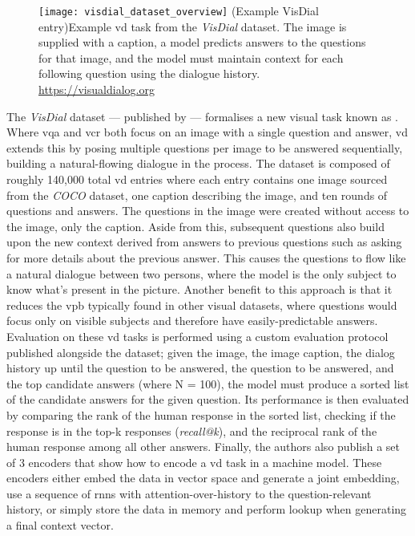 \begin{figure}[htbp]
    \centering
    \texttt{[image: visdial\_dataset\_overview]}
    \captionsource(Example VisDial entry){Example \gls{vd} task from the \textit{VisDial} dataset. The image is supplied with a caption, a model predicts answers to the questions for that image, and the model must maintain context for each following question using the dialogue history. \label{fig:visdial_question_answer}}{\url{https://visualdialog.org}}
\end{figure}

The \textit{VisDial} dataset --- published by \citeauthor{das_visual_2019} \cite{das_visual_2019} --- formalises a new visual task known as .
Where \gls{vqa} and \gls{vcr} both focus on an image with a single question and answer, \gls{vd} extends this by posing multiple questions per image to be answered sequentially, building a natural-flowing dialogue in the process.
The dataset is composed of roughly 140,000 total \gls{vd} entries where each entry contains one image sourced from the \textit{COCO} dataset\cite{lin_microsoft_2015}, one caption describing the image, and ten rounds of questions and answers.
The questions in the image were created without access to the image, only the caption.
Aside from this, subsequent questions also build upon the new context derived from answers to previous questions such as asking for more details about the previous answer.
This causes the questions to flow like a natural dialogue between two persons, where the model is the only subject to know what's present in the picture.
Another benefit to this approach is that it reduces the \gls{vpb} typically found in other visual datasets, where questions would focus only on visible subjects and therefore have easily-predictable answers.
Evaluation on these \gls{vd} tasks is performed using a custom evaluation protocol published alongside the dataset; given the image, the image caption, the dialog history up until the question to be answered, the question to be answered, and the top candidate answers (where N = 100), the model must produce a sorted list of the candidate answers for the given question.
Its performance is then evaluated by comparing the rank of the human response in the sorted list, checking if the response is in the top-k responses (\textit{recall@k}), and the reciprocal rank of the human response among all other answers.
Finally, the authors also publish a set of 3 encoders that show how to encode a \gls{vd} task in a machine model.
These encoders either embed the data in vector space and generate a joint embedding, use a sequence of \glspl{rnn} with attention-over-history to the question-relevant history, or simply store the data in memory and perform lookup when generating a final context vector.

